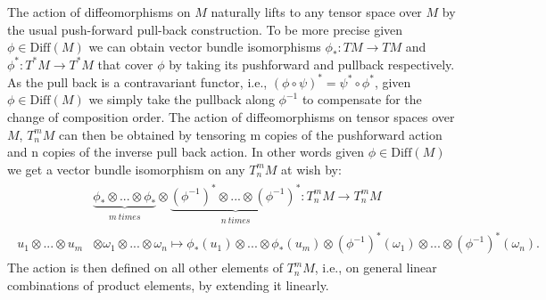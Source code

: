 The action of diffeomorphisms on $M$ naturally lifts to any tensor space over $M$ by the usual push-forward pull-back construction. To be more precise given $\phi \in \mathrm{Diff}(M)$ we can obtain vector bundle isomorphisms $\phi_{\ast} : TM \rightarrow TM $ and $\phi^{\ast} : T^{\ast}M \rightarrow T^{\ast}M$ that cover $\phi$ by taking its pushforward and pullback respectively. As the pull back is a contravariant functor, i.e., $(\phi \circ \psi)^{\ast}=\psi^{\ast}\circ \phi^{\ast}$, given $\phi \in \mathrm{Diff}(M)$ we simply take the pullback along $\phi^{-1}$ to compensate for the change of composition order. The action of diffeomorphisms on tensor spaces over $M$, $T^m_nM$ can then be obtained by tensoring m copies of the pushforward action and n copies of the inverse pull back action. In other words given $\phi \in \mathrm{Diff}(M)$ we get a vector bundle isomorphism on any $T^m_nM$ at wish by:
\begin{align}
\begin{aligned}
    &\underbrace{\phi_{\ast} \otimes ... \otimes \phi_{\ast}}_{\substack{m \  times}} \otimes \underbrace{(\phi^{-1})^{\ast} \otimes ... \otimes (\phi^{-1})^{\ast} }_{\substack{n \  times}} : T^m_nM \longrightarrow T^m_nM \\
    u_1 \otimes ... \otimes u_m &\otimes \omega_1 \otimes ... \otimes \omega_n \longmapsto \phi_{\ast} (u_1) \otimes ... \otimes \phi_{\ast}(u_m) \otimes (\phi^{-1})^{\ast}(\omega_1) \otimes ... \otimes (\phi^{-1})^{\ast}(\omega_n).
\end{aligned}
\end{align}
The action is then defined on all other elements of $T^m_nM$, i.e., on general linear combinations of product elements, by extending it linearly.

\begin{comment}
Note that there is a slight duplication in our notation: Before a superscripted $\ast$ denoted the dual of a linear map, the dual of a vector-space/bundle, etc. Here the superscripted $\ast$ denotes the pull back of a given diffeomorphism. The connection between the two notions and henceforth the reason for the apparent duplication in the notation can be explained regarding the standard definition of the pullback: Let $\phi \in \mathrm{Diff}(M)$, $p \in M$, $u \in T_pM$, and  $\omega \in T^{\ast}_{\phi(p)}M$ then pushforward and pullback of $\phi$ restrict to linear maps $(\phi_{\ast}) _p :  T_pM \rightarrow T_{\phi(p)}M$ and $\phi^{\ast}_{\phi(p)} : T^{\ast}_{\phi(p)}M \rightarrow T^{\ast}_pM$, where the pullback is defined by the requirement $\phi^{\ast}_{\phi(p)}\omega (u) := \omega ((\phi_{\ast})_p u)$. Comparing this with definition \ref{dual} the dual of a linear map we see that the pull back really defines the fiber wise dual of the pushforward. 
\end{comment}


